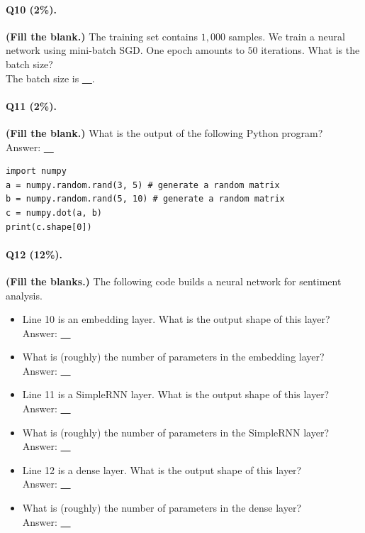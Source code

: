 \documentclass[11pt]{article}
\numberwithin{equation}{section}
\begin{document}
\paragraph{Q10 (2\%).} 
{\bf (Fill the blank.)}
The training set contains $1,000$ samples.
We train a neural network using mini-batch SGD.
One epoch amounts to $50$ iterations.
What is the batch size? \\
The batch size is \underline{~\qquad\qquad\qquad~}. \\




\paragraph{Q11 (2\%).} 
{\bf (Fill the blank.)}
What is the output of the following Python program?\\
Answer: \underline{~\qquad\qquad\qquad~}



\begin{lstlisting}
import numpy
a = numpy.random.rand(3, 5) # generate a random matrix
b = numpy.random.rand(5, 10) # generate a random matrix
c = numpy.dot(a, b)
print(c.shape[0])

\end{lstlisting}
\vspace{3mm}


\paragraph{Q12 (12\%).} 
{\bf (Fill the blanks.)}
The following code builds a neural network for sentiment analysis.
\begin{itemize}
	\item 
	Line 10 is an embedding layer. 
	What is the output shape of this layer?\\
	Answer: \underline{~\qquad\qquad\qquad~}
	\item 
	What is (roughly) the number of parameters in the embedding layer?\\
	Answer: \underline{~\qquad\qquad\qquad~}
	\item 
	Line 11 is a SimpleRNN layer. 
	What is the output shape of this layer?\\
	Answer: \underline{~\qquad\qquad\qquad~}
	\item 
	What is (roughly) the number of parameters in the SimpleRNN layer?\\
	Answer: \underline{~\qquad\qquad\qquad~}
	\item 
	Line 12 is a dense layer. 
	What is the output shape of this layer?\\
	Answer: \underline{~\qquad\qquad\qquad~}
	\item 
	What is (roughly) the number of parameters in the dense layer?\\
	Answer: \underline{~\qquad\qquad\qquad~}
\end{itemize}
\end{document}

